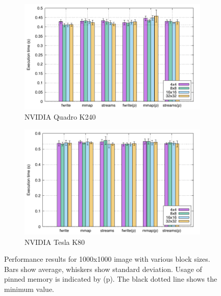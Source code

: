 \documentclass{article}
\begin{document}

\begin{figure}
    \begin{subfigure}{\linewidth}
        \includegraphics{../fig/sm30-1000.pdf}
        \caption{NVIDIA Quadro K240}
    \end{subfigure}
    \begin{subfigure}{\linewidth}
        \includegraphics{../fig/sm37-1000.pdf}
        \caption{NVIDIA Tesla K80}
    \end{subfigure}
    \caption{Performance results for 1000x1000 image with various block sizes.
        Bars show average, whiskers show standard deviation. Usage of pinned
    memory is indicated by (p). The black dotted line shows the minimum value.}
    \label{fig:1000}
\end{figure}
\end{document}
